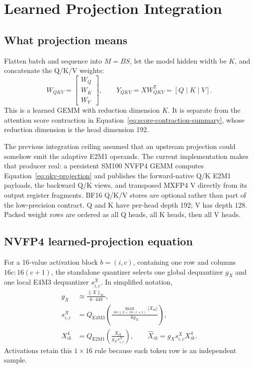 \section{Learned Projection Integration}
\label{sec:projection-integration}

\subsection{What projection means}

Flatten batch and sequence into $M=BS$, let the model hidden width be $K$,
and concatenate the Q/K/V weights:
\begin{equation}
  W_{QKV}=
  \begin{bmatrix}W_Q\\W_K\\W_V\end{bmatrix},\qquad
  Y_{QKV}=XW_{QKV}^{\mathsf T}=[Q\mid K\mid V].
  \label{eq:qkv-projection}
\end{equation}
This is a learned GEMM with reduction dimension $K$.  It is separate from the
attention score contraction in Equation~\ref{eq:score-contraction-summary},
whose reduction dimension is the head dimension 192.

The previous integration ceiling assumed that an upstream projection could
somehow emit the adaptive E2M1 operands.  The current implementation makes
that producer real: a persistent SM100 NVFP4 GEMM computes
Equation~\ref{eq:qkv-projection} and publishes the forward-native Q/K E2M1
payloads, the backward Q/K views, and transposed MXFP4 V directly from its
output register fragments.  BF16 Q/K/V stores are optional rather than part
of the low-precision contract.  Q and K have per-head depth 192; V has depth
128.  Packed weight rows are ordered as all Q heads, all K heads, then all V
heads.

\subsection{NVFP4 learned-projection equation}

For a 16-value activation block $b=(i,c)$, containing one row and columns
$16c{:}16(c+1)$, the standalone quantizer selects one global dequantizer
$g_X$ and one local E4M3 dequantizer $s^X_{i,c}$.  In simplified notation,
\begin{align}
  g_X &\approx \frac{\lVert X\rVert_\infty}{6\cdot448},\\
  s^X_{i,c} &= Q_{\mathrm{E4M3}}\!\left(
    \frac{\max_{16c\le k<16(c+1)}|X_{ik}|}{6g_X}
  \right),\\
  X^4_{ik} &= Q_{\mathrm{E2M1}}\!\left(
    \frac{X_{ik}}{g_Xs^X_{i,c}}
  \right),\qquad
  \widehat X_{ik}=g_Xs^X_{i,c}X^4_{ik}.
  \label{eq:nvfp4-projection-operand}
\end{align}
Activations retain this $1\times16$ rule because each token row is an
independent sample.

